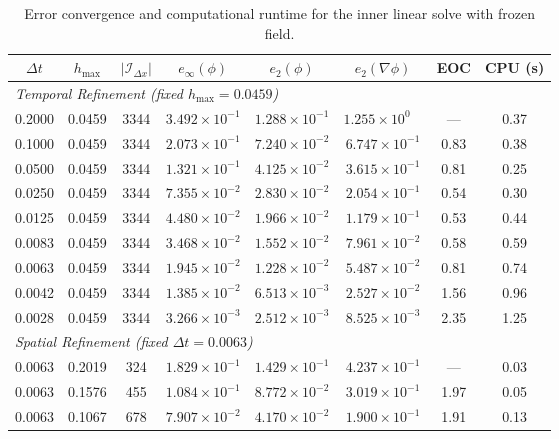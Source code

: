 \documentclass[10pt,a4paper]{article}
\begin{document}
\begin{table}[htbp]
\centering
\small
\caption{Error convergence and computational runtime for the inner linear solve with frozen field.}
\label{tab:frozen_field}
\vspace{0.5em}
\begin{tabular}{cccccccc}
\toprule
$\Delta t$ & $h_{\max}$ & $|\mathcal{I}_{\Delta x}|$ & $e_\infty(\phi)$ & $e_2(\phi)$ & $e_2(\nabla \phi)$ & EOC & CPU (s) \\
\midrule
\multicolumn{8}{l}{\textit{Temporal Refinement (fixed $h_{\max} = 0.0459$)}} \\
0.2000 & 0.0459 & 3344 & $3.492 \times 10^{-1}$ & $1.288 \times 10^{-1}$ & $1.255 \times 10^{0\phantom{-}}$  & ---  & 0.37 \\
0.1000 & 0.0459 & 3344 & $2.073 \times 10^{-1}$ & $7.240 \times 10^{-2}$ & $6.747 \times 10^{-1}$ & 0.83 & 0.38 \\
0.0500 & 0.0459 & 3344 & $1.321 \times 10^{-1}$ & $4.125 \times 10^{-2}$ & $3.615 \times 10^{-1}$ & 0.81 & 0.25 \\
0.0250 & 0.0459 & 3344 & $7.355 \times 10^{-2}$ & $2.830 \times 10^{-2}$ & $2.054 \times 10^{-1}$ & 0.54 & 0.30 \\
0.0125 & 0.0459 & 3344 & $4.480 \times 10^{-2}$ & $1.966 \times 10^{-2}$ & $1.179 \times 10^{-1}$ & 0.53 & 0.44 \\
0.0083 & 0.0459 & 3344 & $3.468 \times 10^{-2}$ & $1.552 \times 10^{-2}$ & $7.961 \times 10^{-2}$ & 0.58 & 0.59 \\
0.0063 & 0.0459 & 3344 & $1.945 \times 10^{-2}$ & $1.228 \times 10^{-2}$ & $5.487 \times 10^{-2}$ & 0.81 & 0.74 \\
0.0042 & 0.0459 & 3344 & $1.385 \times 10^{-2}$ & $6.513 \times 10^{-3}$ & $2.527 \times 10^{-2}$ & 1.56 & 0.96 \\
0.0028 & 0.0459 & 3344 & $3.266 \times 10^{-3}$ & $2.512 \times 10^{-3}$ & $8.525 \times 10^{-3}$ & 2.35 & 1.25 \\
\midrule
\multicolumn{8}{l}{\textit{Spatial Refinement (fixed $\Delta t = 0.0063$)}} \\
0.0063 & 0.2019 & \phantom{0}324 & $1.829 \times 10^{-1}$ & $1.429 \times 10^{-1}$ & $4.237 \times 10^{-1}$ & ---  & 0.03 \\
0.0063 & 0.1576 & \phantom{0}455 & $1.084 \times 10^{-1}$ & $8.772 \times 10^{-2}$ & $3.019 \times 10^{-1}$ & 1.97 & 0.05 \\
0.0063 & 0.1067 & \phantom{0}678 & $7.907 \times 10^{-2}$ & $4.170 \times 10^{-2}$ & $1.900 \times 10^{-1}$ & 1.91 & 0.13 \\

\end{tabular}
\end{table}
\end{document}
